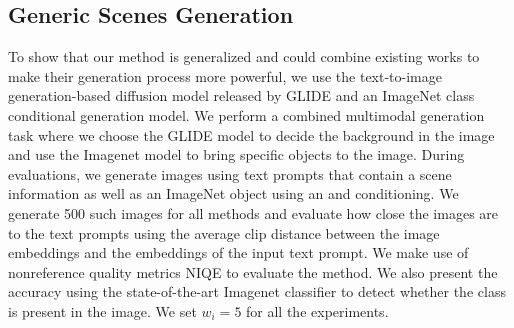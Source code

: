 \documentclass[10pt,twocolumn,letterpaper]{article}
\begin{document}
\subsection{Generic Scenes Generation}
\label{sec:generic}
To show that our method is generalized and could combine existing works to make their generation process more powerful, we use the text-to-image generation-based diffusion model released by GLIDE and an ImageNet class conditional generation model. We perform a combined multimodal generation task where we choose the GLIDE model to decide the background in the image and use the Imagenet model to bring specific objects to the image. During evaluations, we generate images using text prompts that contain a scene information as well as an ImageNet object using an and conditioning. We generate 500 such images for all methods and evaluate how close the images are to the text prompts using the average clip distance between the image embeddings and the embeddings of the input text prompt. We make use of nonreference quality metrics NIQE to evaluate the method. We also present the accuracy using the state-of-the-art Imagenet classifier\cite{tan2019efficientnet} to detect whether the class is present in the image. We set  $w_i=5$ for all the experiments. 
\end{document}
